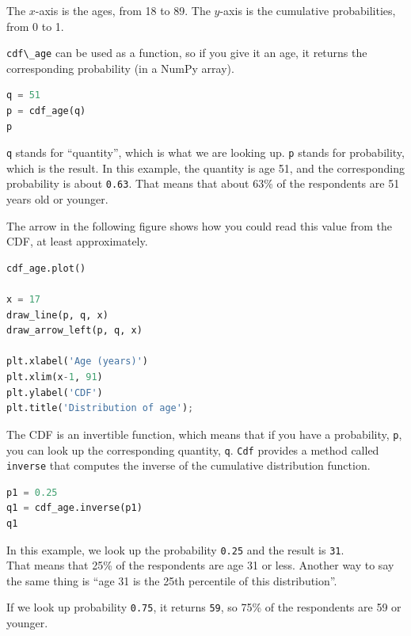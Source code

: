 The \(x\)-axis is the ages, from 18 to 89. The \(y\)-axis is the
cumulative probabilities, from 0 to 1.

\passthrough{\lstinline!cdf\_age!} can be used as a function, so if you
give it an age, it returns the corresponding probability (in a NumPy
array).

\begin{lstlisting}[language=Python,style=source]
q = 51
p = cdf_age(q)
p
\end{lstlisting}

\passthrough{\lstinline!q!} stands for ``quantity'', which is what we
are looking up. \passthrough{\lstinline!p!} stands for probability,
which is the result. In this example, the quantity is age 51, and the
corresponding probability is about \passthrough{\lstinline!0.63!}. That
means that about 63\% of the respondents are 51 years old or younger.

The arrow in the following figure shows how you could read this value
from the CDF, at least approximately.

\begin{lstlisting}[language=Python,style=source]
cdf_age.plot()

x = 17
draw_line(p, q, x)
draw_arrow_left(p, q, x)

plt.xlabel('Age (years)')
plt.xlim(x-1, 91)
plt.ylabel('CDF')
plt.title('Distribution of age');
\end{lstlisting}

The CDF is an invertible function, which means that if you have a
probability, \passthrough{\lstinline!p!}, you can look up the
corresponding quantity, \passthrough{\lstinline!q!}.
\passthrough{\lstinline!Cdf!} provides a method called
\passthrough{\lstinline!inverse!} that computes the inverse of the
cumulative distribution function.

\begin{lstlisting}[language=Python,style=source]
p1 = 0.25
q1 = cdf_age.inverse(p1)
q1
\end{lstlisting}

In this example, we look up the probability
\passthrough{\lstinline!0.25!} and the result is
\passthrough{\lstinline!31!}.\\
That means that 25\% of the respondents are age 31 or less. Another way
to say the same thing is ``age 31 is the 25th percentile of this
distribution''.

If we look up probability \passthrough{\lstinline!0.75!}, it returns
\passthrough{\lstinline!59!}, so 75\% of the respondents are 59 or
younger.

